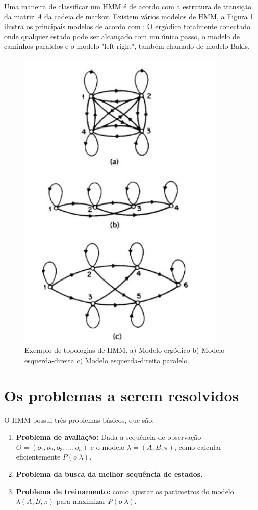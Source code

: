 \quad Uma maneira de classificar um HMM é de acordo com a estrutura de transição da matriz $A$ da cadeia de markov. Existem vários modelos de HMM, a Figura \ref{fig:topohmm} ilustra os  principais modelos de acordo com \cite{fundRecFala}; O ergódico totalmente conectado onde qualquer estado pode ser alcançado com um único passo, o modelo de caminhos paralelos e o modelo "left-right", também chamado de modelo Bakis.%
\begin{figure}[H]
\centering %
\includegraphics[width=10cm]{img/topohmm.jpg} %
\caption{Exemplo de topologias de HMM. a) Modelo ergódico b) Modelo esquerda-direita c) Modelo esquerda-direita paralelo. \textit{\cite{fundRecFala}}}
\label{fig:topohmm}
\end{figure}

\section{Os problemas a serem resolvidos}
\label{sec:3prob}
\quad O HMM possui três problemas básicos, que são:
\begin{enumerate}
\item \textbf{Problema de avaliação:} Dada a sequência de observação $O = (o_1, o_2, o_3, ..., o_n)$ e o modelo $\lambda = (A, B, \pi)$, como calcular eficientemente $P(o| \lambda)$.
\item \textbf{Problema da busca da melhor sequência de estados.}
\item \textbf{Problema de treinamento:} como ajustar os parâmetros do modelo $\lambda(A, B, \pi)$ para maximizar $P(o|\lambda)$.
\end{enumerate}

